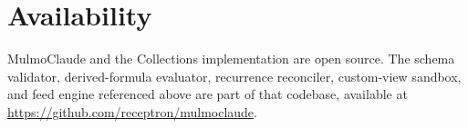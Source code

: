 \documentclass[11pt]{article}
\begin{document}
\section*{Availability}
MulmoClaude and the Collections implementation are open source. The schema
validator, derived-formula evaluator, recurrence reconciler, custom-view sandbox,
and feed engine referenced above are part of that codebase, available at
\url{https://github.com/receptron/mulmoclaude}.



\end{document}

